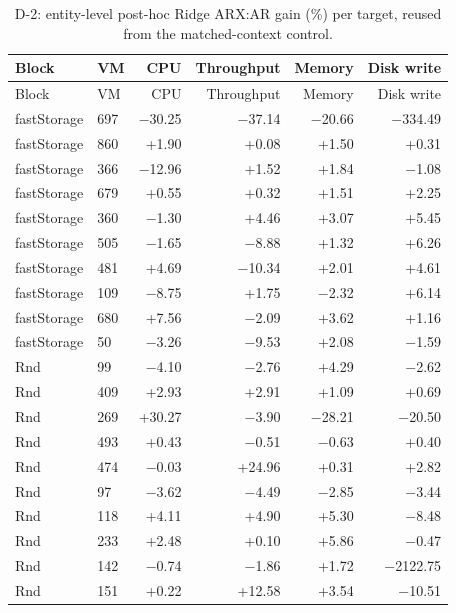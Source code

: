 \normalsize\setlength{\tabcolsep}{4pt}
\small
\setlength{\tabcolsep}{3pt}
\begin{longtable}{@{}llrrrr@{}}
\caption{D-2: entity-level post-hoc Ridge ARX:AR gain (\%) per target, reused from the matched-context control.}\label{tab:supp-t2-d2}\\
\toprule
Block & VM & CPU & Throughput & Memory & Disk write \\
\midrule
\endfirsthead
\toprule
Block & VM & CPU & Throughput & Memory & Disk write \\
\midrule
\endhead
\bottomrule
\endfoot
fastStorage & 697 & $-$30.25 & $-$37.14 & $-$20.66 & $-$334.49 \\
fastStorage & 860 & +1.90 & +0.08 & +1.50 & +0.31 \\
fastStorage & 366 & $-$12.96 & +1.52 & +1.84 & $-$1.08 \\
fastStorage & 679 & +0.55 & +0.32 & +1.51 & +2.25 \\
fastStorage & 360 & $-$1.30 & +4.46 & +3.07 & +5.45 \\
fastStorage & 505 & $-$1.65 & $-$8.88 & +1.32 & +6.26 \\
fastStorage & 481 & +4.69 & $-$10.34 & +2.01 & +4.61 \\
fastStorage & 109 & $-$8.75 & +1.75 & $-$2.32 & +6.14 \\
fastStorage & 680 & +7.56 & $-$2.09 & +3.62 & +1.16 \\
fastStorage & 50 & $-$3.26 & $-$9.53 & +2.08 & $-$1.59 \\
Rnd & 99 & $-$4.10 & $-$2.76 & +4.29 & $-$2.62 \\
Rnd & 409 & +2.93 & +2.91 & +1.09 & +0.69 \\
Rnd & 269 & +30.27 & $-$3.90 & $-$28.21 & $-$20.50 \\
Rnd & 493 & +0.43 & $-$0.51 & $-$0.63 & +0.40 \\
Rnd & 474 & $-$0.03 & +24.96 & +0.31 & +2.82 \\
Rnd & 97 & $-$3.62 & $-$4.49 & $-$2.85 & $-$3.44 \\
Rnd & 118 & +4.11 & +4.90 & +5.30 & $-$8.48 \\
Rnd & 233 & +2.48 & +0.10 & +5.86 & $-$0.47 \\
Rnd & 142 & $-$0.74 & $-$1.86 & +1.72 & $-$2122.75 \\
Rnd & 151 & +0.22 & +12.58 & +3.54 & $-$10.51 \\
\end{longtable}
\normalsize\setlength{\tabcolsep}{4pt}
\small
\setlength{\tabcolsep}{3pt}
